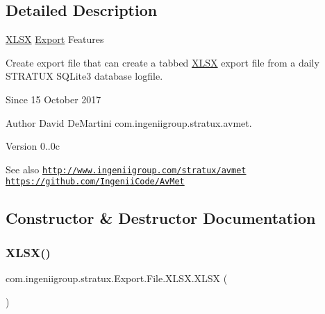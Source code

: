 \subsection{Detailed Description}
\hyperlink{classcom_1_1ingeniigroup_1_1stratux_1_1_export_1_1_file_1_1_x_l_s_x}{X\+L\+SX} \hyperlink{namespacecom_1_1ingeniigroup_1_1stratux_1_1_export}{Export} Features

Create export file that can create a tabbed \hyperlink{classcom_1_1ingeniigroup_1_1stratux_1_1_export_1_1_file_1_1_x_l_s_x}{X\+L\+SX} export file from a daily S\+T\+R\+A\+T\+UX S\+Q\+Lite3 database logfile.

\begin{DoxySince}{Since}
15 October 2017 
\end{DoxySince}
\begin{DoxyAuthor}{Author}
David De\+Martini  com.\+ingeniigroup.\+stratux.\+avmet. 
\end{DoxyAuthor}
\begin{DoxyVersion}{Version}
0..\+0c 
\end{DoxyVersion}
\begin{DoxySeeAlso}{See also}
\href{http://www.ingeniigroup.com/stratux/avmet}{\tt http\+://www.\+ingeniigroup.\+com/stratux/avmet}  \href{https://github.com/IngeniiCode/AvMet}{\tt https\+://github.\+com/\+Ingenii\+Code/\+Av\+Met} 
\end{DoxySeeAlso}


\subsection{Constructor \& Destructor Documentation}
\mbox{\label{classcom_1_1ingeniigroup_1_1stratux_1_1_export_1_1_file_1_1_x_l_s_x_aabe2f65c1f64183c64e676908edbc5b6}} 
\subsubsection{\texorpdfstring{X\+L\+S\+X()}{XLSX()}\hspace{0.1cm}{\footnotesize\ttfamily [1/4]}}
{\footnotesize\ttfamily com.\+ingeniigroup.\+stratux.\+Export.\+File.\+X\+L\+S\+X.\+X\+L\+SX (\begin{DoxyParamCaption}{ }\end{DoxyParamCaption})}

